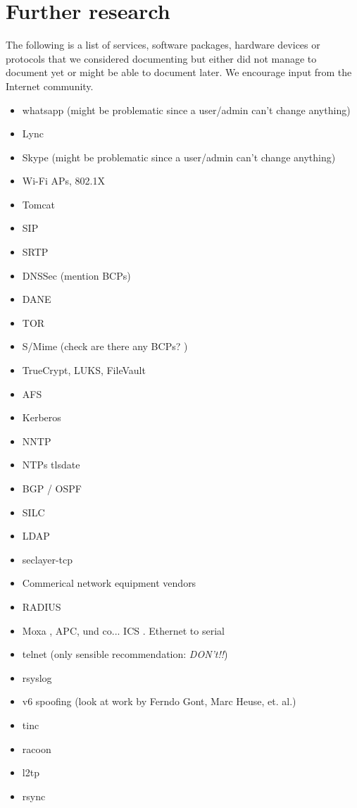 \chapter{Further research}
\label{cha:further-research}
The following is a list of services, software packages, hardware devices or protocols that we considered documenting but either did not manage to document yet or might be able to document later. We encourage input from the Internet community. 

\begin{multicols}{3}
\begin{itemize}
  \item whatsapp (might be problematic since a user/admin can't change anything)
  \item Lync
  \item Skype (might be problematic since a user/admin can't change anything)
  \item Wi-Fi APs, 802.1X
  \item Tomcat
  \item SIP
  \item SRTP
  \item DNSSec (mention BCPs)
  \item DANE
  \item TOR
  \item S/Mime (check are there any BCPs? )
  \item TrueCrypt, LUKS, FileVault
  \item AFS
  \item Kerberos
  \item NNTP
  \item NTPs tlsdate
  \item BGP / OSPF
  \item SILC
  \item LDAP
  \item seclayer-tcp
  \item Commerical network equipment vendors
  \item RADIUS
  \item Moxa , APC, und co... ICS . Ethernet to serial
  \item telnet (only sensible recommendation: \emph{DON't!!})
  \item rsyslog
  \item v6 spoofing (look at work by Ferndo Gont, Marc Heuse, et. al.)
  \item tinc
  \item racoon
  \item l2tp
  \item rsync

\end{itemize}
\end{multicols}
